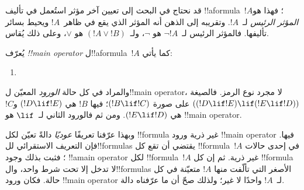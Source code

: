 \documentclass[../../../include/open-logic-section]{subfiles}
\begin{document}


\begin{explain}
قد نحتاج في البحث إلى تعيين آخر مؤثر استُعمل في تأليف
!!a{formula}~$!A$؛ فهذا هو \emph{المؤثر الرئيس}
لـ~$!A$. وتقريبه إلى الذهن أنه المؤثر الذي يقع في ظاهر~$!A$
ويحيط بسائر تأليفها. فالمؤثر الرئيس لـ~$\lnot !A$ هو $\lnot$،
ولـ~$(!A \lor !B)$ هو $\lor$، وعلى ذلك يُقاس.
\end{explain}


\begin{defn}
يُعرّف \emph{!!{main operator}} ل!!a{formula}~$!A$ كما يأتي:
\begin{enumerate}
\item {}







\end{enumerate}
\end{defn}

والمراد في كل حالة \emph{الورود} المعيّن ل!!{main
operator}، لا مجرد نوع الرمز. فالصيغة $((!D \lif !E) \lif (!E \lif
!D))$ على صورة $(!B \lif !C)$؛ فيها $!B$ هي $(!D \lif !E)$ و$!C$
هي $(!E \lif !D)$. ومن ثم فالورود الثاني لـ~$\lif$ هو !!{main
operator}.

\begin{explain}
وبهذا عرّفنا تعريفًا \emph{عوديًا} دالةً تعيّن لكل !!{formula}
غير ذرية ورود !!{main operator} فيها. فإن التعريف الاستقرائي
لل!!{formula}s يقتضي أن تقع كل !!{formula}~$!A$ في إحدى حالات
؛ فثبت بذلك وجود !!a{main operator} لكل
!!{formula}~$!A$ غير ذرية. ثم إن كل !!{formula} لا تدخل إلا تحت
شرط واحد، وال!!{formula}s الأصغر التي تألّفت منها
$!A$ متعيّنة في كل حالة. فكان ورود !!{main operator}
لـ~$!A$ واحدًا لا غير؛ ولذلك صحّ أن ما عرّفناه دالة.
\end{explain}
\end{document}
